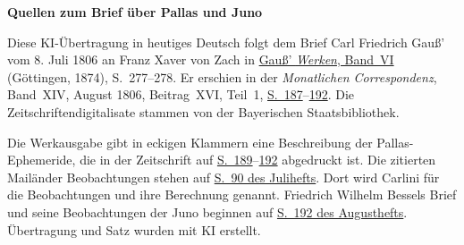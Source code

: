 \clearpage\thispagestyle{empty}
\begin{center}\textbf{Quellen zum Brief über Pallas und Juno}\end{center}
\noindent Diese KI-Übertragung in heutiges Deutsch folgt dem Brief Carl Friedrich Gauß’ vom 8. Juli 1806 an Franz Xaver von Zach in \href{https://gdz.sub.uni-goettingen.de/id/PPN236007467}{Gauß’ \textit{Werken}, Band~VI} (Göttingen, 1874), S.~277--278. Er erschien in der \textit{Monatlichen Correspondenz}, Band~XIV, August 1806, Beitrag~XVI, Teil~1, \href{https://www.digitale-sammlungen.de/en/view/bsb10538606?page=201}{S.~187}--\href{https://www.digitale-sammlungen.de/en/view/bsb10538606?page=206}{192}. Die Zeitschriftendigitalisate stammen von der Bayerischen Staatsbibliothek.
\par\medskip
Die Werkausgabe gibt in eckigen Klammern eine Beschreibung der Pallas-Ephemeride, die in der Zeitschrift auf \href{https://www.digitale-sammlungen.de/en/view/bsb10538606?page=203}{S.~189}--\href{https://www.digitale-sammlungen.de/en/view/bsb10538606?page=206}{192} abgedruckt ist. Die zitierten Mailänder Beobachtungen stehen auf \href{https://www.digitale-sammlungen.de/en/view/bsb10538606?page=100}{S.~90 des Julihefts}. Dort wird Carlini für die Beobachtungen und ihre Berechnung genannt. Friedrich Wilhelm Bessels Brief und seine Beobachtungen der Juno beginnen auf \href{https://www.digitale-sammlungen.de/en/view/bsb10538606?page=206}{S.~192 des Augusthefts}. Übertragung und Satz wurden mit KI erstellt.
\clearpage
